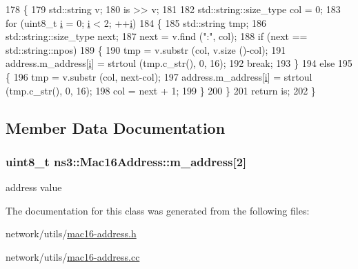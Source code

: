 \begin{DoxyCode}
178 \{
179   std::string v;
180   is >> v;
181 
182   std::string::size\_type col = 0;
183   \textcolor{keywordflow}{for} (uint8\_t \hyperlink{bernuolliDistribution_8m_a6f6ccfcf58b31cb6412107d9d5281426}{i} = 0; \hyperlink{bernuolliDistribution_8m_a6f6ccfcf58b31cb6412107d9d5281426}{i} < 2; ++\hyperlink{bernuolliDistribution_8m_a6f6ccfcf58b31cb6412107d9d5281426}{i})
184     \{
185       std::string tmp;
186       std::string::size\_type next;
187       next = v.find (\textcolor{stringliteral}{":"}, col);
188       \textcolor{keywordflow}{if} (next == std::string::npos)
189         \{
190           tmp = v.substr (col, v.size ()-col);
191           address.m\_address[\hyperlink{bernuolliDistribution_8m_a6f6ccfcf58b31cb6412107d9d5281426}{i}] = strtoul (tmp.c\_str(), 0, 16);
192           \textcolor{keywordflow}{break};
193         \}
194       \textcolor{keywordflow}{else}
195         \{
196           tmp = v.substr (col, next-col);
197           address.m\_address[\hyperlink{bernuolliDistribution_8m_a6f6ccfcf58b31cb6412107d9d5281426}{i}] = strtoul (tmp.c\_str(), 0, 16);
198           col = next + 1;
199         \}
200     \}
201   \textcolor{keywordflow}{return} is;
202 \}
\end{DoxyCode}


\subsection{Member Data Documentation}
\subsubsection[{\texorpdfstring{m\+\_\+address}{m_address}}]{\setlength{\rightskip}{0pt plus 5cm}uint8\+\_\+t ns3\+::\+Mac16\+Address\+::m\+\_\+address\mbox{[}2\mbox{]}\hspace{0.3cm}{\ttfamily [private]}}\hypertarget{classns3_1_1Mac16Address_ac0c8dd3fecc6d12c91fe96576f4f96a8}{}\label{classns3_1_1Mac16Address_ac0c8dd3fecc6d12c91fe96576f4f96a8}


address value 



The documentation for this class was generated from the following files\+:\begin{DoxyCompactItemize}
\item 
network/utils/\hyperlink{mac16-address_8h}{mac16-\/address.\+h}\item 
network/utils/\hyperlink{mac16-address_8cc}{mac16-\/address.\+cc}\end{DoxyCompactItemize}
